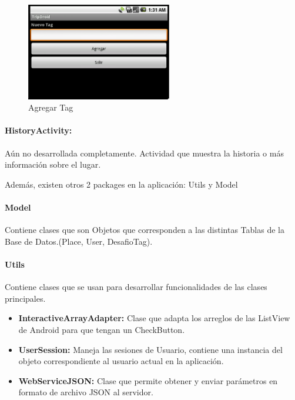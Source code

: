 \documentclass[10pt,letterpaper]{article}
\begin{document}
\begin{figure}[h]
\begin{center}
\includegraphics[width=180pt]{./imgs/TripdroidOpciones.png}
\caption{Agregar Tag}
\end{center}
\end{figure}

\paragraph{HistoryActivity:} Aún no desarrollada completamente. Actividad que muestra la historia o más información sobre el lugar.

\newpage
Además, existen otros 2 packages en la aplicación: Utils y Model\\

\paragraph{Model}

Contiene clases que son Objetos que corresponden a las distintas Tablas de la Base de Datos.(Place, User, DesafioTag).\\

\paragraph{Utils}

Contiene clases que se usan para desarrollar funcionalidades de las clases principales.\\

\begin{itemize}
 \item \textbf{InteractiveArrayAdapter:} Clase que adapta los arreglos de las ListView de Android para que tengan un CheckButton.
 \item \textbf{UserSession:} Maneja las sesiones de Usuario, contiene una instancia del objeto correspondiente al usuario actual en la aplicación.
 \item \textbf{WebServiceJSON:} Clase que permite obtener y enviar parámetros en formato de archivo JSON al servidor.
\end{itemize}
\end{document}
